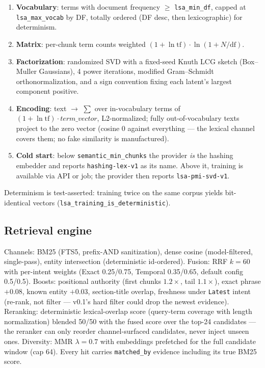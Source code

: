 \begin{enumerate}[itemsep=2pt]
\item \textbf{Vocabulary}: terms with document frequency $\geq$
\texttt{lsa\_min\_df}, capped at \texttt{lsa\_max\_vocab} by DF, totally
ordered (DF desc, then lexicographic) for determinism.
\item \textbf{Matrix}: per-chunk term counts weighted
$(1+\ln\mathrm{tf})\cdot\ln(1+N/\mathrm{df})$.
\item \textbf{Factorization}: randomized SVD with a fixed-seed Knuth LCG
sketch (Box--Muller Gaussians), 4 power iterations, modified Gram--Schmidt
orthonormalization, and a sign convention fixing each latent's largest
component positive.
\item \textbf{Encoding}: text $\rightarrow$ $\sum$ over in-vocabulary terms of
$(1+\ln\mathrm{tf})\cdot\mathit{term\_vector}$, L2-normalized; fully
out-of-vocabulary texts project to the zero vector (cosine 0 against
everything --- the lexical channel covers them; no fake similarity is
manufactured).
\item \textbf{Cold start}: below \texttt{semantic\_min\_chunks} the provider
\emph{is} the hashing embedder \cite{weinberger2009} and reports
\texttt{hashing-lex-v1} as its name. Above it, training is available via API
or job; the provider then reports \texttt{lsa-pmi-svd-v1}.
\end{enumerate}

Determinism is test-asserted: training twice on the same corpus yields
bit-identical vectors (\texttt{lsa\_training\_is\_deterministic}).

\subsection{Retrieval engine}\label{sec:retrieval}

Channels: BM25 (FTS5, prefix-AND sanitization), dense cosine (model-filtered,
single-pass), entity intersection (deterministic id-ordered). Fusion: RRF
$k=60$ with per-intent weights (Exact 0.25/0.75, Temporal 0.35/0.65, default
config 0.5/0.5). Boosts: positional authority (first chunks $1.2\times$, tail
$1.1\times$), exact phrase $+0.08$, known entity $+0.03$, section-title
overlap, freshness under \texttt{Latest} intent (re-rank, not filter ---
v0.1's hard filter could drop the newest evidence). Reranking: deterministic
lexical-overlap score (query-term coverage with length normalization) blended
50/50 with the fused score over the top-24 candidates --- the reranker can
only reorder channel-surfaced candidates, never inject unseen ones. Diversity:
MMR $\lambda=0.7$ with embeddings prefetched for the full candidate window
(cap 64). Every hit carries \texttt{matched\_by} evidence including its true
BM25 score.

